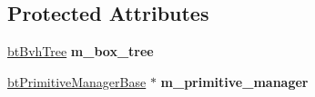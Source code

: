 \subsection*{Protected Attributes}
\begin{DoxyCompactItemize}
\item 
\mbox{\label{classbtGImpactBvh_acfa1fa978bdc38e527f3b776d390e8e4}} 
\hyperlink{classbtBvhTree}{bt\+Bvh\+Tree} {\bfseries m\+\_\+box\+\_\+tree}
\item 
\mbox{\label{classbtGImpactBvh_a99d83c8639f5df7b6cb8cb47bd87e39d}} 
\hyperlink{classbtPrimitiveManagerBase}{bt\+Primitive\+Manager\+Base} $\ast$ {\bfseries m\+\_\+primitive\+\_\+manager}
\end{DoxyCompactItemize}
